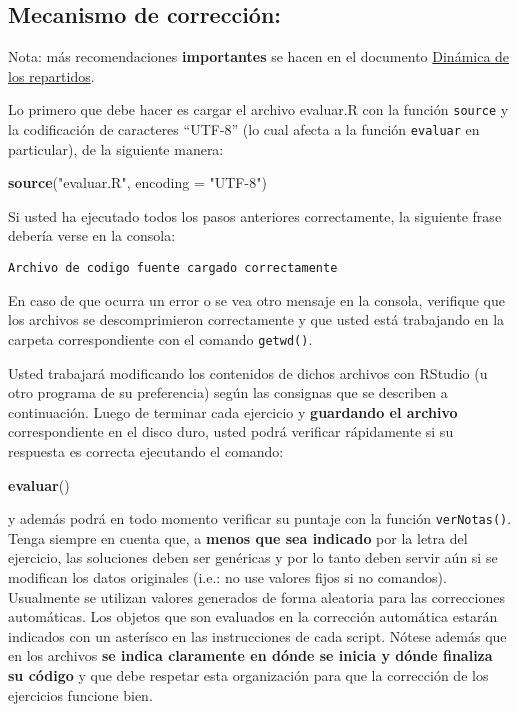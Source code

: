 \documentclass[]{article}
\newenvironment{Shaded}{}{}
\newcommand{\KeywordTok}[1]{\textcolor[rgb]{0.00,0.44,0.13}{\textbf{{#1}}}}
\newcommand{\DataTypeTok}[1]{\textcolor[rgb]{0.56,0.13,0.00}{{#1}}}
\newcommand{\StringTok}[1]{\textcolor[rgb]{0.25,0.44,0.63}{{#1}}}
\newcommand{\NormalTok}[1]{{#1}}
\begin{document}
\subsection{Mecanismo de corrección:}

Nota: más recomendaciones \textbf{importantes} se hacen en el documento
\href{http://goo.gl/P5Wnq}{Dinámica de los repartidos}.

Lo primero que debe hacer es cargar el archivo evaluar.R con la función
\texttt{source} y la codificación de caracteres ``UTF-8'' (lo cual
afecta a la función \texttt{evaluar} en particular), de la siguiente
manera:

\begin{Shaded}
\begin{Highlighting}[]
\KeywordTok{source}\NormalTok{(}\StringTok{"evaluar.R"}\NormalTok{, }\DataTypeTok{encoding =} \StringTok{"UTF-8"}\NormalTok{)}
\end{Highlighting}
\end{Shaded}

Si usted ha ejecutado todos los pasos anteriores correctamente, la
siguiente frase debería verse en la consola:

\begin{verbatim}
Archivo de codigo fuente cargado correctamente
\end{verbatim}

En caso de que ocurra un error o se vea otro mensaje en la consola,
verifique que los archivos se descomprimieron correctamente y que usted
está trabajando en la carpeta correspondiente con el comando
\texttt{getwd()}.

Usted trabajará modificando los contenidos de dichos archivos con
RStudio (u otro programa de su preferencia) según las consignas que se
describen a continuación. Luego de terminar cada ejercicio y
\textbf{guardando el archivo} correspondiente en el disco duro, usted
podrá verificar rápidamente si su respuesta es correcta ejecutando el
comando:

\begin{Shaded}
\begin{Highlighting}[]
\KeywordTok{evaluar}\NormalTok{()}
\end{Highlighting}
\end{Shaded}

y además podrá en todo momento verificar su puntaje con la función
\texttt{verNotas()}. Tenga siempre en cuenta que, a \textbf{menos que
sea indicado} por la letra del ejercicio, las soluciones deben ser
genéricas y por lo tanto deben servir aún si se modifican los datos
originales (i.e.: no use valores fijos si no comandos). Usualmente se
utilizan valores generados de forma aleatoria para las correcciones
automáticas. Los objetos que son evaluados en la corrección automática
estarán indicados con un asterísco en las instrucciones de cada script.
Nótese además que en los archivos \textbf{se indica claramente en dónde
se inicia y dónde finaliza su código} y que debe respetar esta
organización para que la corrección de los ejercicios funcione bien.
\end{document}
